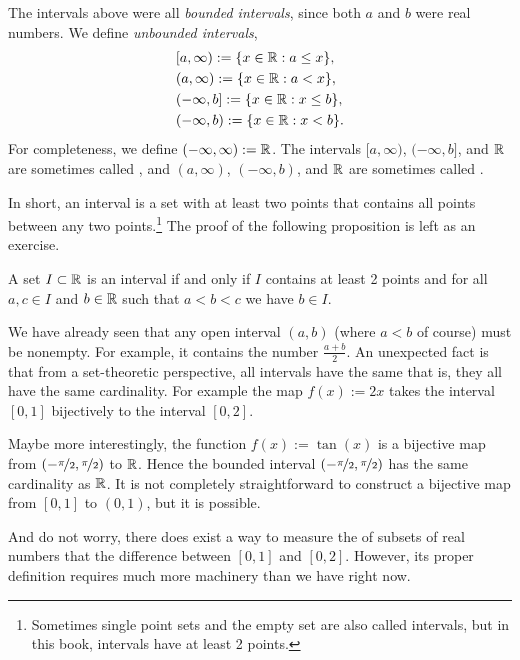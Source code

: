 The intervals above were all \emph{bounded intervals}, since both $a$ and $b$ were real numbers.  We 
define \emph{unbounded intervals},
\begin{align*}
& [a,\infty) := \{ x \in {\mathbb{R}} : a \leq x \}, \\
& (a,\infty) := \{ x \in {\mathbb{R}} : a < x \}, \\
& (-\infty,b] := \{ x \in {\mathbb{R}} : x \leq b \}, \\
& (-\infty,b) := \{ x \in {\mathbb{R}} : x < b \} .
\end{align*}
For completeness, we define $(-\infty,\infty) := {\mathbb{R}}$.
The intervals $[a,\infty)$, $(-\infty,b]$, and ${\mathbb{R}}$ are sometimes called
\emph{},
and $(a,\infty)$, $(-\infty,b)$, and ${\mathbb{R}}$ are sometimes called
\emph{}.

In short, an interval is a set with at least two points
that contains all points between any two
points.\footnote{Sometimes single point sets and the empty set are
also called intervals, but in this book, intervals have at least 2 points.}
The proof of the following proposition is left as an exercise.

\begin{prop} \label{prop:intervaldef}
A set $I \subset {\mathbb{R}}$ is an interval if and only if
$I$ contains at least 2 points and
for all $a,c \in I$ and $b \in {\mathbb{R}}$ such that $a < b < c$ we have $b \in I$.
\end{prop}

We have already seen that any open interval $(a,b)$ (where $a < b$ of course)
must be nonempty.  For example, it contains the number $\frac{a+b}{2}$.
An unexpected fact is that from a set-theoretic perspective,
all intervals have the same  that is, they all have
the same cardinality.  For example the map $f(x) := 2x$
takes the interval $[0,1]$ bijectively to the interval $[0,2]$.

Maybe more interestingly,
the function $f(x) := \tan(x)$
is a bijective map from $(-\nicefrac{\pi}{2},\nicefrac{\pi}{2})$ to ${\mathbb{R}}$.  Hence the bounded
interval $(-\nicefrac{\pi}{2},\nicefrac{\pi}{2})$ has the same cardinality as ${\mathbb{R}}$.  It is not
completely straightforward to construct a bijective map from $[0,1]$ to
$(0,1)$, but it is possible.

And do not worry, there does exist a way to measure the  of subsets
of real numbers that
the difference between $[0,1]$ and $[0,2]$.  However, its proper definition
requires much more machinery than we have right now.

